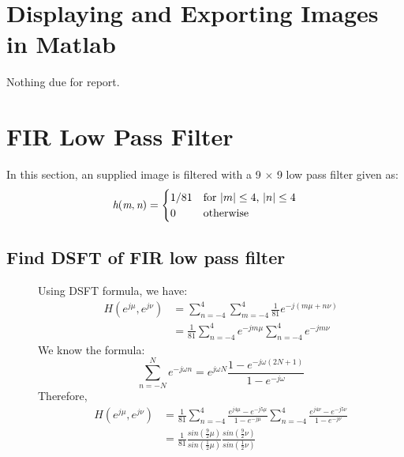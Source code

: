 \documentclass{article}
\DeclarePairedDelimiter{\abs}{\lvert}{\rvert}
\begin{document}
\section{Displaying and Exporting Images in Matlab}

Nothing due for report.


\section{FIR Low Pass Filter}

In this section, an supplied image is filtered with a 9 $\times$ 9 low pass filter given as:
\begin{equation}
\textit{h}(\textit{m},\textit{n}) = \begin{cases}1/81 & \text{for } \abs{m} \le 4 \text{, } \abs{n} \le 4\\
0 & \text{otherwise}\\
\end{cases}
\end{equation}

\subsection{Find DSFT of FIR low pass filter}
\begin{description}
\item[]
Using DSFT formula, we have:
\begin{align*}
H(e^{j\mu},e^{j\nu}) &= {\sum_{n=-4}^{4}\sum_{m=-4}^{4}}\frac{1}{81}e^{-j(m\mu+n\nu)} \\
					 &= \frac{1}{81}{\sum_{n=-4}^{4}}e^{-jm\mu}{\sum_{n=-4}^{4}}e^{-jm\nu}
\end{align*}
We know the formula:
\begin{equation}
{\sum_{n=-N}^{N}}e^{-j\omega n} = e^{j\omega N}\frac{1-e^{-j\omega (2N+1)}}{1-e^{-j\omega}}
\end{equation}
Therefore,
\begin{align*}
H(e^{j\mu},e^{j\nu}) &= \frac{1}{81}{{\sum_{n=-4}^{4}}\frac{e^{j4\mu}-e^{-j5\mu}}{1-e^{-j\mu}}}
{{\sum_{n=-4}^{4}}\frac{e^{j4\nu}-e^{-j5\nu}}{1-e^{-j\nu}}} \\
					 &= \frac{1}{81}{\frac{sin(\frac{9}{2}\mu)}{sin(\frac{1}{2}\mu)}}
                     {\frac{sin(\frac{9}{2}\nu)}{sin(\frac{1}{2}\nu)}}
\end{align*}
\end{description}
\end{document}
